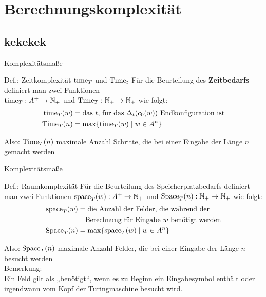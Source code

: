 \section{Berechnungskomplexität}
\subsection{kekekek}
\begin{frame}{Komplexitätsmaße}
	\begin{block}{Def.: Zeitkomplexität $\mathord{\text{time}}_T$ und $\mathord{\text{Time}}_t$}
		Für die Beurteilung des \textbf{Zeitbedarfs} definiert man zwei Funktionen \\
		$\mathord{\text{time}}_T:A^+ \to \mathbb{N}_+$ und $\mathord{\text{Time}}_T:\mathbb{N}_+ \to \mathbb{N}_+$ wie folgt:
		\begin{align*}
  			\mathord{\text{time}}_T(w) &= \text{das $t$, für das $\Delta_t(c_0(w))$ Endkonfiguration ist} \\
  			\mathord{\text{Time}}_T(n)   &= \max \{\mathord{\text{time}}_T(w) \mid w\in A^n\}
		\end{align*}
	\end{block}

	Also: $\mathord{\text{Time}}_T(n)$ maximale Anzahl Schritte, die bei einer Eingabe der Länge $n$ gemacht werden
\end{frame}

\begin{frame}{Komplexitätsmaße}
    \begin{block}{Def.: Raumkomplexität}
    	Für die Beurteilung des Speicherplatzbedarfs definiert man zwei
		Funktionen $\mathord{\text{space}}_T(w):A^+ \to \mathbb{N}_+$ und $\mathord{\text{Space}}_T(n):\mathbb{N}_+ \to \mathbb{N}_+$ wie folgt:
			\begin{align*}
  			\mathord{\text{space}}_T(w) &= \text{die Anzahl der Felder, die während der }\\
               			&\quad  \text{Berechnung für Eingabe $w$ benötigt werden}\\
  			\mathord{\text{Space}}_T(n)   &= \max \{\mathord{\text{space}}_T(w) \mid w\in A^n\} 
			\end{align*}
    \end{block}

    Also: $\mathord{\text{Space}}_T(n)$ maximale Anzahl Felder, die bei einer Eingabe der Länge $n$ besucht werden\\[1em]
    Bemerkung:\\
    Ein Feld gilt als „benötigt“, wenn es zu Beginn ein Eingabesymbol enthält oder irgendwann vom Kopf der Turingmaschine besucht wird. 
\end{frame}

